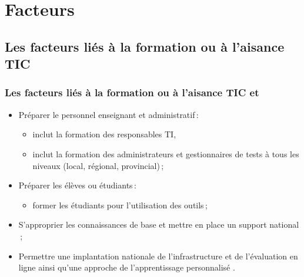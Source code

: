 \documentclass{beamer}
\begin{document}
	\section{Facteurs} 
		
		\subsection{Les facteurs liés à la formation ou à l'aisance TIC} 
			\begin{frame}[allowframebreaks]
			 	\frametitle{Les facteurs liés à la formation ou à l'aisance TIC \citep{NorthCarolina2013} et \citep{Lamontagne2013}}
				\begin {itemize}
					\item Préparer le personnel enseignant et administratif\,:
						\begin {itemize}
							\item inclut la formation des responsables TI,
							\item inclut la formation des administrateurs et gestionnaires de tests à tous les niveaux (local, régional, provincial)\,;
						\end{itemize}	
					\item Préparer les élèves ou étudiants\,:
						\begin {itemize}
							\item former les étudiants pour l'utilisation des outils\,;
						\end{itemize}
					\item S'approprier les connaissances de base et mettre en place un support national \citep{Stansbury2013A}\,;
					\item Permettre une implantation nationale de l'infrastructure et de l'évaluation en ligne ainsi qu'une approche de l'apprentissage personnalisé \citep{Stansbury2013A}.
	
				\end{itemize}
				
			\end{frame}
			
\end{document}
